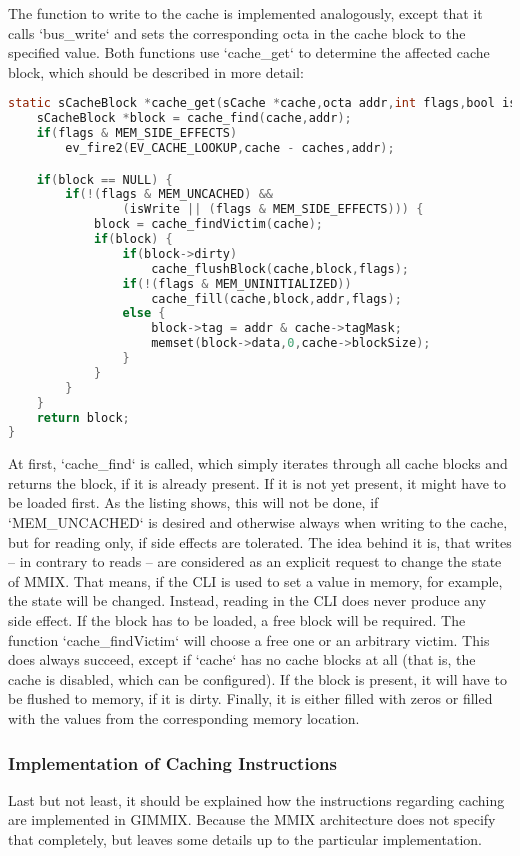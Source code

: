 The function to write to the cache is implemented analogously, except that it calls `bus_write` and sets the corresponding octa in the cache block to the specified value. Both functions use `cache_get` to determine the affected cache block, which should be described in more detail:
\begin{lstlisting}[language=C,caption={Implementation of {\tt cache\_get}}]
static sCacheBlock *cache_get(sCache *cache,octa addr,int flags,bool isWrite) {
	sCacheBlock *block = cache_find(cache,addr);
	if(flags & MEM_SIDE_EFFECTS)
		ev_fire2(EV_CACHE_LOOKUP,cache - caches,addr);

	if(block == NULL) {
		if(!(flags & MEM_UNCACHED) &&
				(isWrite || (flags & MEM_SIDE_EFFECTS))) {
			block = cache_findVictim(cache);
			if(block) {
				if(block->dirty)
					cache_flushBlock(cache,block,flags);
				if(!(flags & MEM_UNINITIALIZED))
					cache_fill(cache,block,addr,flags);
				else {
					block->tag = addr & cache->tagMask;
					memset(block->data,0,cache->blockSize);
				}
			}
		}
	}
	return block;
}
\end{lstlisting}
At first, `cache_find` is called, which simply iterates through all cache blocks and returns the block, if it is already present. If it is not yet present, it might have to be loaded first. As the listing shows, this will not be done, if `MEM_UNCACHED` is desired and otherwise always when writing to the cache, but for reading only, if side effects are tolerated. The idea behind it is, that writes -- in contrary to reads -- are considered as an explicit request to change the state of MMIX. That means, if the CLI is used to set a value in memory, for example, the state will be changed. Instead, reading in the CLI does never produce any side effect. If the block has to be loaded, a free block will be required. The function `cache_findVictim` will choose a free one or an arbitrary victim. This does always succeed, except if `cache` has no cache blocks at all (that is, the cache is disabled, which can be configured). If the block is present, it will have to be flushed to memory, if it is dirty. Finally, it is either filled with zeros or filled with the values from the corresponding memory location.

\subsubsection{Implementation of Caching Instructions}

Last but not least, it should be explained how the instructions regarding caching are implemented in GIMMIX. Because the MMIX architecture does not specify that completely, but leaves some details up to the particular implementation.

